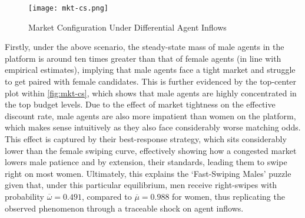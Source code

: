 \begin{figure}[ht]
    \centering
    \caption{Market Configuration Under Differential Agent Inflows}
    \texttt{[image: mkt-cs.png]}
    \label{fig:mkt-cs} 
\end{figure} 

Firstly, under the above scenario, the steady-state mass of male agents in the platform is around ten times greater than that of female agents (in line with empirical estimates), implying that male agents face a tight market and struggle to get paired with female candidates. This is further evidenced by the top-center plot within \autoref{fig:mkt-cs}, which shows that male agents are highly concentrated in the top budget levels. Due to the effect of market tightness on the effective discount rate, male agents are also more impatient than women on the platform, which makes sense intuitively as they also face considerably worse matching odds. This effect is captured by their best-response strategy, which sits considerably lower than the female swiping curve, effectively showing how a congested market lowers male patience and by extension, their standards, leading them to swipe right on most women. Ultimately, this explains the `Fast-Swiping Males' puzzle given that, under this particular equilibrium, men receive right-swipes with probability $\overline\omega=0.491$, compared to $\overline\mu=0.988$ for women, thus replicating the observed phenomenon through a traceable shock on agent inflows.